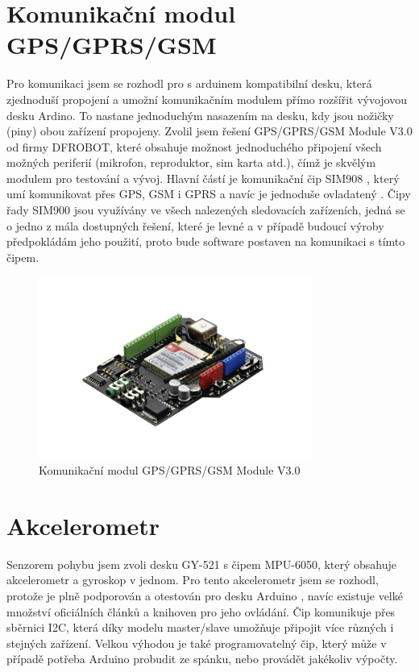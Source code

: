 \documentclass[FM,BP]{tulthesis}  %
\begin{document}
\section{Komunikační modul GPS/GPRS/GSM}
Pro komunikaci jsem se rozhodl pro s arduinem kompatibilní desku, která zjednoduší propojení a umožní komunikačním modulem přímo rozšířit vývojovou desku Ardino. To nastane jednoduchým nasazením na desku, kdy jsou nožičky (piny) obou zařízení propojeny. Zvolil jsem řešení GPS/GPRS/GSM Module V3.0 \cite{ROBOT schematic} od firmy DFROBOT, které obsahuje možnost jednoduchého připojení všech možných periferií (mikrofon, reproduktor, sim karta atd.), čímž je skvělým modulem pro testování a vývoj. Hlavní částí je komunikační čip SIM908 \cite{SIMCOM HW}, který umí komunikovat přes GPS, GSM i GPRS a navíc je jednoduše ovladatený \cite{SIMCOM SW}. Čipy řady SIM900 jsou využívány ve všech nalezených sledovacích zařízeních, jedná se o jedno z mála dostupných řešení, které je levné a v případě budoucí výroby předpokládám jeho použití, proto bude software postaven na komunikaci s tímto čipem.

\begin{figure}[H]
\begin{center}
\includegraphics[width=0.8\textwidth]{images/module.png}
\caption{Komunikační modul GPS/GPRS/GSM Module V3.0}
\label{image}
\end{center}
\end{figure}

\section{Akcelerometr}
Senzorem pohybu jsem zvoli desku GY-521 s čipem MPU-6050, který obsahuje akcelerometr a gyroskop v jednom. Pro tento akcelerometr jsem se rozhodl, protože je plně podporován a otestován pro desku Arduino \cite{Arduino acce}, navíc existuje velké množství oficiálních článků a knihoven \cite{I2cdevlib} pro jeho ovládání. Čip komunikuje přes sběrnici I2C, která díky modelu master/slave umožňuje připojit více různých i stejných zařízení. Velkou výhodou je také programovatelný čip, který může v případě potřeba Arduino probudit ze spánku, nebo provádět jakékoliv výpočty.
\end{document}
